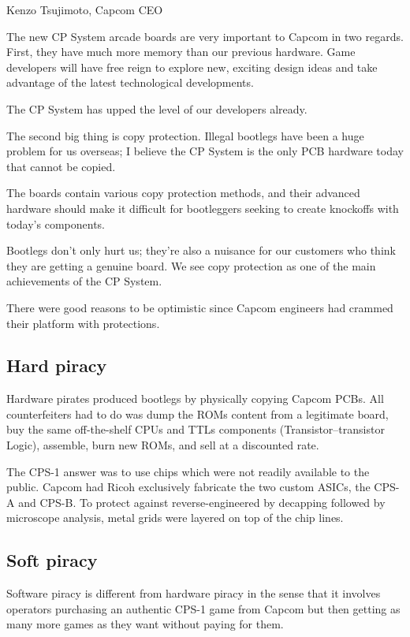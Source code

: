 \begin{q}{Kenzo Tsujimoto, Capcom CEO\cite{gamest38}}
    
The new CP System arcade boards are very important to Capcom in two regards. First, they have much more memory than our previous hardware. Game developers will have free reign to explore new, exciting design ideas and take advantage of the latest technological developments. 

The CP System has upped the level of our developers already.

The second big thing is copy protection. Illegal bootlegs have been a huge problem for us overseas; I believe the CP System is the only PCB hardware today that cannot be copied.

The boards contain various copy protection methods, and their advanced hardware should make it difficult for bootleggers seeking to create knockoffs with today's components. 

Bootlegs don't only hurt us; they're also a nuisance for our customers who think they are getting a genuine board. We see copy protection as one of the main achievements of the CP System.
\end{q}


There were good reasons to be optimistic since Capcom engineers had crammed their platform with protections.

\subsection{Hard piracy}

Hardware pirates produced bootlegs by physically copying Capcom PCBs. All counterfeiters had to do was dump the ROMs content from a legitimate board, buy the same off-the-shelf CPUs and TTLs components (Transistor–transistor Logic), assemble, burn new ROMs, and sell at a discounted rate.

The CPS-1 answer was to use chips which were not readily available to the public. Capcom had Ricoh exclusively fabricate the two custom ASICs, the CPS-A and CPS-B. To protect against reverse-engineered by decapping followed by microscope analysis, metal grids were layered on top of the chip\cite{arcadeHackerCPS1Rev} lines. 


\subsection{Soft piracy}
Software piracy is different from hardware piracy in the sense that it involves operators purchasing an authentic CPS-1 game from Capcom but then getting as many more games as they want without paying for them.

